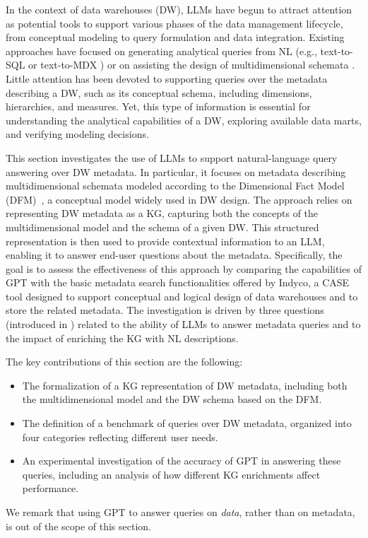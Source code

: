In the context of data warehouses (DW), LLMs have begun to attract attention as potential tools to support various phases of the data management lifecycle, from conceptual modeling to query formulation and data integration. Existing approaches have focused on generating analytical queries from NL (e.g., text-to-SQL \cite{katsogiannis2023survey} or text-to-MDX \cite{DBLP:conf/er/BimonteR25}) or on assisting the design of multidimensional schemata \cite{DBLP:journals/dke/RizziFGG25}. Little attention has been devoted to supporting queries over the metadata describing a DW, such as its conceptual schema, including dimensions, hierarchies, and measures. Yet, this type of information is essential for understanding the analytical capabilities of a DW, exploring available data marts, and verifying modeling decisions.

This section investigates the use of LLMs to support natural-language query answering over DW metadata. In particular, it focuses on metadata describing multidimensional schemata modeled according to the Dimensional Fact Model (DFM)~\cite{golfarelli2009data}, a conceptual model widely used in DW design. The approach relies on representing DW metadata as a KG, capturing both the concepts of the multidimensional model and the schema of a given DW. This structured representation is then used to provide contextual information to an LLM, enabling it to answer end-user questions about the metadata. Specifically, the goal is to assess the effectiveness of this approach by comparing the capabilities of GPT with the basic metadata search functionalities offered by Indyco, a CASE tool designed to support conceptual and logical design of data warehouses and to store the related metadata. The investigation is driven by three questions (introduced in ) related to the ability of LLMs to answer metadata queries and to the impact of enriching the KG with NL descriptions.

The key contributions of this section are the following:
\begin{itemize}
    \item The formalization of a KG representation of DW metadata, including both the multidimensional model and the DW schema based on the DFM.
    \item The definition of a benchmark of queries over DW metadata, organized into four categories reflecting different user needs.
    \item An experimental investigation of the accuracy of GPT in answering these queries, including an analysis of how different KG enrichments affect performance.
\end{itemize}
We remark that using GPT to answer queries on \emph{data}, rather than on metadata, is out of the scope of this section.

